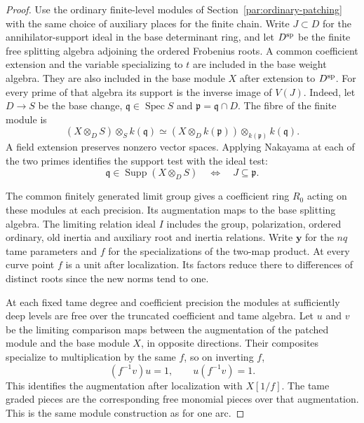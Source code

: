 \begin{proof}
Use the ordinary finite-level modules of
Section~\ref{par:ordinary-patching} with the same
choice of auxiliary places for the finite chain.
Write \(J\subset D\) for the annihilator-support
ideal in the base determinant ring, and let
\(D^{\rm sp}\) be the finite free splitting algebra
adjoining the ordered Frobenius roots. A common
coefficient extension and the variable specializing
to \(t\) are included in the base weight algebra.
They are also included in the base module \(X\)
after extension to \(D^{\rm sp}\). For every prime
of that algebra its support is the inverse image
of \(V(J)\). Indeed, let \(D\to S\) be the base change, \(\mathfrak q\in\operatorname{Spec}S\) and \(\mathfrak p=\mathfrak q\cap D\). The fibre of the finite module is
\[
 (X\otimes_D S)\otimes_S k(\mathfrak q)
  \simeq (X\otimes_D k(\mathfrak p))
                    \otimes_{k(\mathfrak p)} k(\mathfrak q).
\]
A field extension preserves nonzero vector spaces. Applying Nakayama at each of the two primes identifies the support test with the ideal test:
\[
 \mathfrak q\in\operatorname{Supp}(X\otimes_D S)\quad\Longleftrightarrow\quad J\subseteq\mathfrak p .
\]

The common finitely generated limit group gives
a coefficient ring \(R_0\) acting on these modules
at each precision. Its augmentation maps to the
base splitting algebra. The limiting relation ideal
\(I\) includes the group, polarization, ordered
ordinary, old inertia and auxiliary root and inertia
relations. Write \(\mathbf y\) for the \(nq\) tame
parameters and \(f\) for the specializations of the
two-map product. At every curve point \(f\) is a unit
after localization. Its factors reduce there to
differences of distinct roots since the new norms
tend to one.

At each fixed tame degree and coefficient precision
the modules at sufficiently deep levels are free
over the truncated coefficient and tame algebra.
Let \(u\) and \(v\) be the limiting comparison maps between the augmentation of the patched module and the base module \(X\), in opposite directions. Their composites specialize to multiplication by the same \(f\), so on inverting \(f\),
\[
 (f^{-1}v)u=1,\qquad u(f^{-1}v)=1 .
\]
This identifies the augmentation after localization with \(X[1/f]\).
The tame graded pieces are the corresponding
free monomial pieces over that augmentation.
This is the same module construction as for
one arc.


\end{proof}
